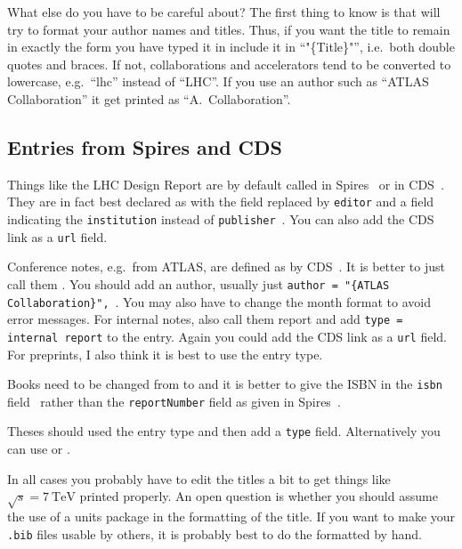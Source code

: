 What else do you have to be careful about? The first thing to know is
that \BibTeX{} will try to format your author names and titles. Thus,
if you want the title to remain in exactly the form you have typed it
in include it in \enquote{"\{Title\}"}, i.e.\ both double quotes and
braces. If not, collaborations and accelerators tend to be converted
to lowercase, e.g.\ \enquote{lhc} instead of \enquote{LHC}. If you use
an author such as ``ATLAS Collaboration'' it get printed as
\enquote{A.\ Collaboration}.


\subsection{Entries from Spires and CDS}
\label{sec:ref:cds}

Things like the LHC Design Report are by default
called  in Spires~\cite{Bruning:2004ej-inspire} or
 in CDS~\cite{Bruening:782076-CDS}. They are in fact
best declared as  with the  field
replaced by \texttt{editor} and a field indicating the
\texttt{institution} instead of
\texttt{publisher}~\cite{lhc:vol1-final}. You can also add the CDS
link as a \texttt{url} field.

Conference notes, e.g.\ from ATLAS, are defined
as  by CDS~\cite{ATLAS-CONF-2011-008-CDS}. It is
better to just call them . You should add an author,
usually just \texttt{author = "\{ATLAS
  Collaboration\}",}~\cite{ATLAS-CONF-2011-008-final}. You may also
have to change the month format to avoid error messages. For internal
notes, also call them report and add \texttt{type = {internal report}}
to the entry. Again you could add the CDS link as a \texttt{url}
field. For preprints, I also think it is best to use
the  entry type.

Books need to be changed from  to
 and it is better to give the ISBN in the \texttt{isbn}
field~\cite{Halzen:1984mc-final} rather than the \texttt{reportNumber}
field as given in Spires~\cite{Halzen:1984mc-inspire}.

Theses should used the  entry type and
then add a \texttt{type} field. Alternatively you can use
 or .

In all cases you probably have to edit the titles a bit to get
things like $\sqrt{s} = \SI{7}{\TeV}$ printed properly. An open
question is whether you should assume the use of a units package in
the formatting of the title. If you want to make your \texttt{.bib}
files usable by others, it is probably best to do the formatted by
hand.

